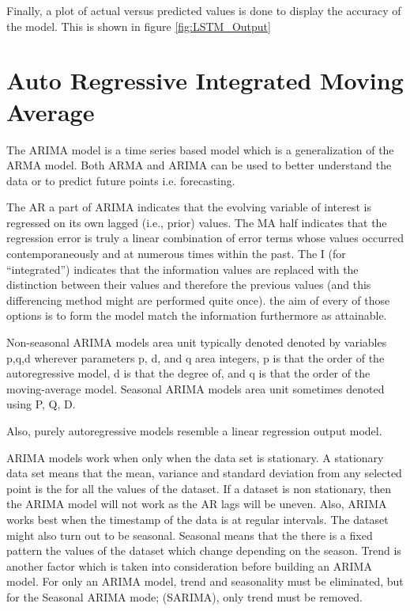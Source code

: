 \documentclass[BTech]{srmuthesis}
\begin{document}
Finally, a plot of actual versus predicted values is done to display the accuracy of the model. This is shown in figure \ref{fig:LSTM_Output}

\pagebreak

\section{Auto Regressive Integrated Moving Average}

The ARIMA model is a time series based model which is a generalization of the ARMA model. Both ARMA and ARIMA can be used to better understand the data or to predict future points i.e. forecasting. 

The AR a part of ARIMA indicates that the evolving variable of interest is regressed on its own lagged (i.e., prior) values. The MA half indicates that the regression error is truly a linear combination of error terms whose values occurred contemporaneously and at numerous times within the past. The I (for ``integrated'') indicates that the information values are replaced with the distinction between their values and therefore the previous values (and this differencing method might are performed quite once). the aim of every of those options is to form the model match the information furthermore as attainable.

Non-seasonal ARIMA models area unit typically denoted denoted by variables p,q,d wherever parameters p, d, and q area integers, p is that the order of the autoregressive model, d is that the degree of, and q is that the order of the moving-average model. Seasonal ARIMA models area unit sometimes denoted using P, Q, D.

Also, purely autoregressive models resemble a linear regression output model.

ARIMA models work when only when the data set is stationary. A stationary data set means that the mean, variance and standard deviation from any selected point is the for all the values of the dataset. If a dataset is non stationary, then the ARIMA model will not work as the AR lags will be uneven. Also, ARIMA works best when the timestamp of the data is at regular intervals. The dataset might also turn out to be seasonal. Seasonal means that the there is a fixed pattern the values of the dataset which change depending on the season. Trend is another factor which is taken into consideration before building an ARIMA model. For only an ARIMA model, trend and seasonality must be eliminated, but for the Seasonal ARIMA mode; (SARIMA), only trend must be removed. 
\end{document}
